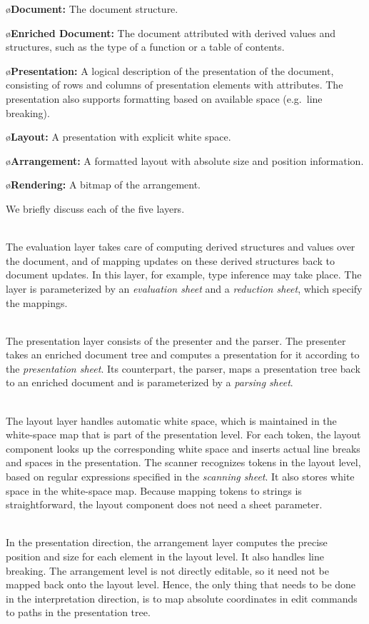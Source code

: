 \documentclass[10pt]{article}
\begin{document}
\bl
\o {\bf Document:} The document structure.

\o {\bf Enriched Document:} The document attributed with derived values and structures, such as the type of a function or a table of contents.

\o{\bf Presentation:} A logical description of the presentation of the document, consisting of rows and columns of presentation elements with attributes. The presentation also supports formatting based on available space (e.g.\ line breaking).

\o{\bf Layout:} A presentation with explicit white space. 

\o{\bf Arrangement:} A formatted layout with absolute size and position information.

\o{\bf Rendering:} A bitmap of the arrangement.
\el


\bc
We briefly discuss each of the five layers.

\\
The evaluation layer takes care of computing derived structures and values over the document, and of mapping updates on these derived structures back to document updates. In this layer, for example, type inference may take place. The layer is parameterized by an {\em evaluation sheet} and a {\em reduction sheet}, which specify the mappings. 

\\
The presentation layer consists of the presenter and the parser. The presenter takes an enriched document tree and computes a presentation for it according to the {\em presentation sheet}. Its counterpart, the parser, maps a presentation tree back to an enriched document and is parameterized by a {\em parsing sheet}.

\\
The layout layer handles automatic white space, which is maintained in the white-space map that is part of the presentation level. For each token, the layout component looks up the corresponding white space and inserts actual line breaks and spaces in the presentation. The scanner recognizes tokens in the layout level, based on regular expressions specified in the {\em scanning sheet}. It also stores white space in the white-space map. Because mapping tokens to strings is straightforward, the layout component does not need a sheet parameter.

\\
In the presentation direction, the arrangement layer computes the precise position and size for each element in the layout level. It also handles line breaking. The arrangement level is not directly editable, so it need not be mapped back onto the layout level. Hence, the only thing that needs to be done in the interpretation direction, is to map absolute coordinates in edit commands to paths in the presentation tree. 
\end{document}
